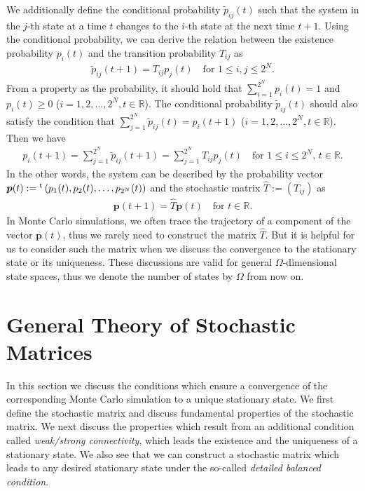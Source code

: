We additionally define the conditional probability $\tilde{p}_{ij}(t)$ such that the system in the $j$-th state at a time $t$ changes to the $i$-th state at the next time $t+1$. Using the conditional probability, we can derive the relation between the existence probability $p_{i}(t)$ and the transition probability $T_{ij}$ as
\begin{align}
\tilde{p}_{ij}(t + 1) = T_{ij} p_{j}(t)\quad\text{for $1\leq i,j\leq 2^{N}$}.
\end{align}
From a property as the probability, it should hold that $\sum_{i=1}^{2^{N}}p_{i}(t)=1$ and $p_{i}(t) \ge 0$ ($i=1,2,\dots,2^{N}, t\in\mathbb{R}$). The conditional probability $\tilde{p}_{ij}(t)$ should also satisfy the condition that $\sum_{j=1}^{2^{N}}\tilde{p}_{ij}(t) = p_{i}(t+1)$ ($i=1,2,\dots,2^{N}, t\in\mathbb{R}$). Then we have
\begin{align}
p_{i}(t+1) = \sum_{j=1}^{2^{N}}\tilde{p}_{ij}(t + 1) = \sum_{j=1}^{2^{N}}T_{ij}p_{j}(t)\quad\text{for $1\leq i\leq 2^{N}$, $t\in\mathbb{R}$}.
\end{align}
In the other words, the system can be described by the probability vector $\bm{p}(t):={}^{\rm t}\left(p_{1}(t),p_{2}(t),\dots,p_{2^{N}}(t)\right)$ and the stochastic matrix $\hat{T}:=\left(T_{ij}\right)$ as
\begin{align}
\bm{p}(t + 1) = \hat{T}\bm{p}(t)\quad\text{for $t\in\mathbb{R}$}.
\end{align}
In Monte Carlo simulations, we often trace the trajectory of a component of the vector $\bm{p}(t)$, thus we rarely need to construct the matrix $\hat{T}$. But it is helpful for us to consider such the matrix when we discuss the convergence to the stationary state or its uniqueness. These discussions are valid for general $\Omega$-dimensional state spaces, thus we denote the number of states by $\Omega$ from now on.

\section{General Theory of Stochastic Matrices}

In this section we discuss the conditions which ensure a convergence of the corresponding Monte Carlo simulation to a unique stationary state. We first define the stochastic matrix and discuss fundamental properties of the stochastic matrix. We next discuss the properties which result from an additional condition called \textit{weak/strong connectivity}, which leads the existence and the uniqueness of a stationary state. We also see that we can construct a stochastic matrix which leads to any desired stationary state under the so-called \textit{detailed balanced condition}.

